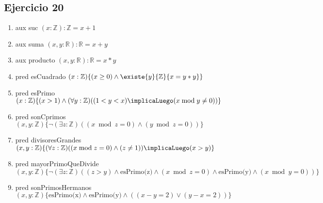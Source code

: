 \subsection{Ejercicio 20}
\begin{enumerate}
    \item aux suc $(x:\mathbb{Z}):\mathbb{Z} = x + 1$
    \item aux suma $(x, y:\mathbb{R}):\mathbb{R} = x + y$
    \item aux producto $(x, y:\mathbb{R}):\mathbb{R} = x*y$
    \item pred esCuadrado $(x: \mathbb{Z}) \{ (x \geq 0) \wedge \existe{y}{\mathbb{Z}}{x = y*y}\}$
    \item pred esPrimo $(x:\mathbb{Z})\{(x > 1) \wedge (\forall y:\mathbb{Z}) ((1 < y < x) \implicaLuego (x \bmod y \neq 0))\}$
    \item pred sonCprimos $(x, y:\mathbb{Z}) \{\neg (\exists z: \mathbb{Z})((x \bmod z = 0) \wedge (y \bmod z = 0)) \}$
    \item pred divisoresGrandes $(x, y:\mathbb{Z}) \{(\forall z: \mathbb{Z}) ((x \bmod z = 0) \wedge (z \neq 1)) \implicaLuego (x > y) \}$
    \item pred mayorPrimoQueDivide $(x, y:\mathbb{Z}) \{\neg (\exists z:\mathbb{Z})((z > y) \wedge \text{esPrimo(z)} \wedge (x \bmod z = 0) \wedge \text{esPrimo(y)} \wedge ( x\bmod y = 0)) \}$
    \item pred sonPrimosHermanos $(x, y:\mathbb{Z}) \{ \text{esPrimo(x)} \wedge \text{esPrimo(y)} \wedge ((x-y=2) \vee (y-x=2)) \}$
\end{enumerate}


